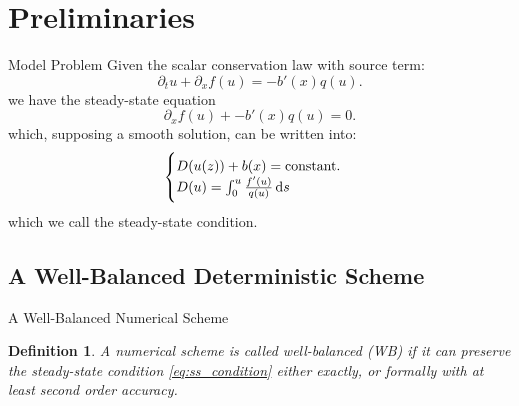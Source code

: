 \documentclass[
    pdf,
    11pt,
    xcolor={svgnames},
  ]{beamer}
\newtheorem*{definition}{Definition}
\begin{document}
\section{Preliminaries}

\begin{frame}{Model Problem}
    Given the scalar conservation law with source term:
    \begin{equation} \label{eq:model}
        \partial_t u + \partial_x f(u) = -b'(x) q(u).
    \end{equation}
    we have the steady-state equation
    \begin{equation} \label{eq:model_ss}
         \partial_x f(u) + -b'(x) q(u) = 0.
    \end{equation}
    which, supposing a smooth solution, can be written into:
    \begin{equation} \label{eq:ss_condition}
        \begin{cases}
            D(u(z)) + b(x) = {\rm constant}. \\
            D(u) = \int_0^u \frac{f'(u)}{q(u)} \dd{s}
        \end{cases}
    \end{equation}
    which we call the steady-state condition.
\end{frame}

\subsection{A Well-Balanced Deterministic Scheme}
\begin{frame}{A Well-Balanced Numerical Scheme}
    \begin{definition}
        A numerical scheme is called well-balanced (WB) if it can preserve the steady-state condition \eqref{eq:ss_condition} either exactly, or formally with at least second order accuracy.
    \end{definition}
\end{frame}
\end{document}
